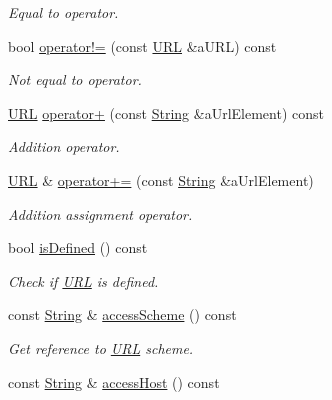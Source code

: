 \begin{DoxyCompactItemize}
\begin{DoxyCompactList}\small\item\em Equal to operator. \end{DoxyCompactList}\item 
bool \hyperlink{classostk_1_1io_1_1_u_r_l_af0e7f1e614d4268332deb8255cfd042a}{operator!=} (const \hyperlink{classostk_1_1io_1_1_u_r_l}{U\+RL} \&a\+U\+RL) const
\begin{DoxyCompactList}\small\item\em Not equal to operator. \end{DoxyCompactList}\item 
\hyperlink{classostk_1_1io_1_1_u_r_l}{U\+RL} \hyperlink{classostk_1_1io_1_1_u_r_l_a6af6a4ec30e137242a80b51096ef09b2}{operator+} (const \hyperlink{namespaceostk_1_1io_a95d49b120613a7610cb1b4f03b1116b6}{String} \&a\+Url\+Element) const
\begin{DoxyCompactList}\small\item\em Addition operator. \end{DoxyCompactList}\item 
\hyperlink{classostk_1_1io_1_1_u_r_l}{U\+RL} \& \hyperlink{classostk_1_1io_1_1_u_r_l_a07e4a0573aa017fc782ed6712f3df3f9}{operator+=} (const \hyperlink{namespaceostk_1_1io_a95d49b120613a7610cb1b4f03b1116b6}{String} \&a\+Url\+Element)
\begin{DoxyCompactList}\small\item\em Addition assignment operator. \end{DoxyCompactList}\item 
bool \hyperlink{classostk_1_1io_1_1_u_r_l_ae777a4a970e3c36af2ca1e22a72336de}{is\+Defined} () const
\begin{DoxyCompactList}\small\item\em Check if \hyperlink{classostk_1_1io_1_1_u_r_l}{U\+RL} is defined. \end{DoxyCompactList}\item 
const \hyperlink{namespaceostk_1_1io_a95d49b120613a7610cb1b4f03b1116b6}{String} \& \hyperlink{classostk_1_1io_1_1_u_r_l_ac807a165cb3da86a7b9cea5800754fa1}{access\+Scheme} () const
\begin{DoxyCompactList}\small\item\em Get reference to \hyperlink{classostk_1_1io_1_1_u_r_l}{U\+RL} scheme. \end{DoxyCompactList}\item 
const \hyperlink{namespaceostk_1_1io_a95d49b120613a7610cb1b4f03b1116b6}{String} \& \hyperlink{classostk_1_1io_1_1_u_r_l_a2faf73b2ba1fd2224a6f53a1883d8340}{access\+Host} () const

\end{DoxyCompactItemize}
